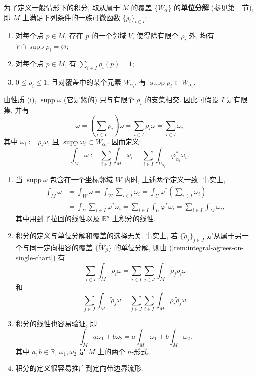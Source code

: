 为了定义一般情形下的积分, 取从属于 $M$ 的覆盖 $\{W_\alpha\}$ 的\textbf{单位分解} (参见第~~节), 即 $M$ 上满足下列条件的一族可微函数 $\{\rho_i\}_{i\in I}$:
\begin{enumerate}[label=(\roman*),leftmargin=*]
\item 对每个点 $p\in M$, 存在 $p$ 的一个邻域 $V$, 使得除有限个 $\rho_i$ 外, 均有 $V\cap\operatorname{supp}\rho_i=\varnothing$;
\item 对每个点 $p\in M$, 有 $\sum_{i\in I}\rho_i(p)=1$;
\item $0\leq\rho_i\leq1$, 且对覆盖中的某个元素 $W_{\alpha_i}$, 有 $\operatorname{supp}\rho_i\subset W_{\alpha_i}$.
\end{enumerate}
由性质 (i), $\operatorname{supp}\omega$ (它是紧的) 只与有限个 $\rho_i$ 的支集相交. 因此可假设 $I$ 是有限集, 并有
\[
  \omega=\left(\sum_{i\in I}\rho_i\right)\omega
  =\sum_{i\in I}\rho_i\omega=\sum_{i\in I}\omega_i
\]
其中 $\omega_i:=\rho_i\omega$, 且 $\operatorname{supp}\omega_i\subset W_{\alpha_i}$. 因而定义:
\[
  \int_M\omega:=\sum_{i\in I}\int_M\omega_i
  =\sum_{i\in I}\int_{U_{\alpha_i}}\varphi_{\alpha_i}^*\omega_i.
\]

\begin{RiemannRemark}\label{rem:well-definedness-of-integration}
\begin{enumerate}[label=(\arabic*),ref=\arabic*,leftmargin=*]
\item\label{rem:integral-agrees-on-single-chart} 当 $\operatorname{supp}\omega$ 包含在一个坐标邻域 $W$ 内时, 上述两个定义一致. 事实上,
\begin{align*}
  \int_M\omega&=\int_W\omega=\int_W\sum_{i\in I}\omega_i
   =\int_U\varphi^*\left(\sum_{i\in I}\omega_i\right)\\
  &=\int_U\sum_{i\in I}\varphi^*\omega_i
   =\sum_{i\in I}\int_U\varphi^*\omega_i=\sum_{i\in I}\int_M\omega_i,
\end{align*}
其中用到了拉回的线性以及 $\mathbb{R}^n$ 上积分的线性.
\item 积分的定义与单位分解和覆盖的选择无关. 事实上, 若 $\{\widetilde\rho_j\}_{j\in J}$ 是从属于另一个与同一定向相容的覆盖 $\{\widetilde W_\beta\}$ 的单位分解, 则由 (\ref{rem:integral-agrees-on-single-chart}) 有
\[
  \sum_{i\in I}\int_M\rho_i\omega
  =\sum_{i\in I}\sum_{j\in J}\int_M\widetilde\rho_j\rho_i\omega
\]
和
\[
  \sum_{j\in J}\int_M\widetilde\rho_j\omega
  =\sum_{j\in J}\sum_{i\in I}\int_M\rho_i\widetilde\rho_j\omega.
\]
\item 积分的线性也容易验证, 即
\[
  \int_Ma\omega_1+b\omega_2=a\int_M\omega_1+b\int_M\omega_2.
\]
其中 $a,b\in\mathbb{R}$, $\omega_1,\omega_2$ 是 $M$ 上的两个 $n$-形式.
\item 积分的定义很容易推广到定向带边界流形.
\end{enumerate}
\end{RiemannRemark}

